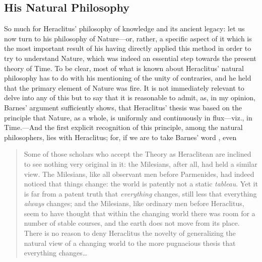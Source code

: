 \subsection{His Natural Philosophy\label{subsec_HNP}}
So much for Heraclitus' philosophy of knowledge and its ancient legacy: let us now turn to his philosophy of Nature---or, rather, a specific aspect of it which is the most important result of his having directly applied this method in order to try to understand Nature, which was indeed an essential step towards the present theory of Time. To be clear, most of what is known about Heraclitus' natural philosophy has to do with his mentioning of the unity of contraries, and he held that the primary element of Nature was fire. It is not immediately relevant to delve into any of this but to say that it is reasonable to admit, as, in my opinion, Barnes' argument \cite{Barnes1982} sufficiently shows, that Heraclitus' thesis was based on the principle that Nature, as a whole, is uniformly and continuously in flux---viz., in Time.---And the first explicit recognition of this principle, among the natural philosophers, lies with Heraclitus; for, if we are to take Barnes' word \cite{Barnes1982}, even
\begin{quote}
Some of those scholars who accept the Theory as Heraclitean are inclined to see nothing very original in it: the Milesians, after all, had held a similar view. The Milesians, like all observant men before Parmenides, had indeed noticed that things change: the world is patently not a static \textit{tableau}. Yet it is far from a patent truth that \textit{everything} changes, still less that everything \textit{always} changes; and the Milesians, like ordinary men before Heraclitus, seem to have thought that within the changing world there was room for a number of stable courses, and the earth does not move from its place. There is no reason to deny Heraclitus the novelty of generalizing the natural view of a changing world to the more pugnacious thesis that everything changes\ldots
\end{quote}

